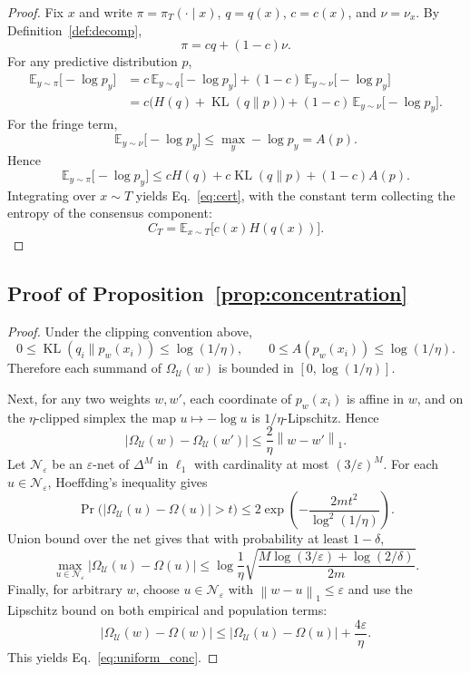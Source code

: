 \documentclass{article}
\newcommand{\EE}{\mathbb{E}}
\newcommand{\cU}{\mathcal{U}}
\newcommand{\KL}{\operatorname{KL}}
\newcommand{\norm}[1]{\left\lVert #1 \right\rVert}
\newcommand{\simplex}{\Delta}
\begin{document}
\begin{proof}
Fix $x$ and write $\pi = \pi_T(\cdot\mid x)$, $q=q(x)$, $c=c(x)$, and $\nu=\nu_x$. By Definition~\ref{def:decomp},
\[
    \pi = c q + (1-c)\nu.
\]
For any predictive distribution $p$,
\begin{align*}
    \EE_{y\sim\pi}\big[-\log p_y\big]
    &=
    c\, \EE_{y\sim q}\big[-\log p_y\big]
    +
    (1-c)\, \EE_{y\sim \nu}\big[-\log p_y\big] \\
    &=
    c\Big(H(q)+\KL(q\|p)\Big)
    +
    (1-c)\, \EE_{y\sim\nu}\big[-\log p_y\big].
\end{align*}
For the fringe term,
\[
    \EE_{y\sim\nu}\big[-\log p_y\big]
    \le
    \max_y -\log p_y
    =
    A(p).
\]
Hence
\[
    \EE_{y\sim\pi}\big[-\log p_y\big]
    \le
    cH(q)
    +
    c\KL(q\|p)
    +
    (1-c)A(p).
\]
Integrating over $x\sim T$ yields Eq.~\eqref{eq:cert}, with the constant term collecting the entropy of the consensus component:
\[
    C_T
    =
    \EE_{x\sim T}\big[c(x)H(q(x))\big].
\]
\end{proof}

\subsection{Proof of Proposition~\ref{prop:concentration}}

\begin{proof}
Under the clipping convention above,
\[
    0 \le \KL(q_i\|p_w(x_i)) \le \log(1/\eta),
    \qquad
    0 \le A(p_w(x_i)) \le \log(1/\eta).
\]
Therefore each summand of $\Omega_{\cU}(w)$ is bounded in $[0,\log(1/\eta)]$.

Next, for any two weights $w,w'$, each coordinate of $p_w(x_i)$ is affine in $w$, and on the $\eta$-clipped simplex the map $u\mapsto -\log u$ is $1/\eta$-Lipschitz. Hence
\[
    \left|
        \Omega_{\cU}(w)-\Omega_{\cU}(w')
    \right|
    \le
    \frac{2}{\eta}\norm{w-w'}_1.
\]
Let $\mathcal N_{\varepsilon}$ be an $\varepsilon$-net of $\simplex^M$ in $\ell_1$ with cardinality at most $(3/\varepsilon)^M$. For each $u\in\mathcal N_{\varepsilon}$, Hoeffding's inequality gives
\[
    \Pr\Big(
        |\Omega_{\cU}(u)-\Omega(u)| > t
    \Big)
    \le
    2\exp\!\left(
        -\frac{2m t^2}{\log^2(1/\eta)}
    \right).
\]
Union bound over the net gives that with probability at least $1-\delta$,
\[
    \max_{u\in\mathcal N_{\varepsilon}}
    |\Omega_{\cU}(u)-\Omega(u)|
    \le
    \log\!\frac{1}{\eta}
    \sqrt{
        \frac{M\log(3/\varepsilon)+\log(2/\delta)}{2m}
    }.
\]
Finally, for arbitrary $w$, choose $u\in\mathcal N_\varepsilon$ with $\norm{w-u}_1\le\varepsilon$ and use the Lipschitz bound on both empirical and population terms:
\[
    |\Omega_{\cU}(w)-\Omega(w)|
    \le
    |\Omega_{\cU}(u)-\Omega(u)|
    +
    \frac{4\varepsilon}{\eta}.
\]
This yields Eq.~\eqref{eq:uniform_conc}.
\end{proof}
\end{document}
